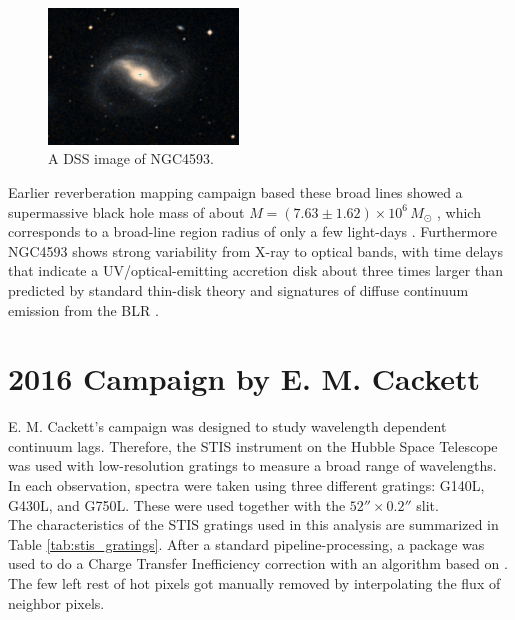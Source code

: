 \newpage

\begin{figure}[!ht]
	\centering
	\includegraphics[width=0.45\textwidth]{pictures/Chapter3/NGC4593.PNG}
	\caption{A DSS image of NGC4593.}
	\label{fig:NGC4593}
\end{figure}


 Earlier reverberation mapping campaign based these broad lines showed a supermassive black hole mass of about $M = \left(7.63 \pm 1.62\right) \times 10^6\,M_\odot$ \parencite{bentz2015agn}, which corresponds to a broad-line region radius of only a few light-days \parencite{denney2006ngc4593}. Furthermore NGC4593 shows strong variability from X-ray to optical bands, with time delays that indicate a UV/optical-emitting accretion disk about three times larger than predicted by standard thin-disk theory and signatures of diffuse continuum emission from the BLR \parencite{cackett2018accretion}. 


\section{2016 Campaign by E. M. Cackett}
\label{Campaign_Cackett}

E. M. Cackett's campaign was designed to study wavelength dependent continuum lags. Therefore, the STIS instrument on the Hubble Space Telescope was used with low-resolution gratings to measure a broad range of wavelengths. In each observation, spectra were taken using three different gratings: G140L, G430L, and G750L. These were used together with the $52'' \times 0.2''$ slit.\\
The characteristics of the STIS gratings used in this analysis are summarized in Table \ref{tab:stis_gratings}. After a standard pipeline-processing, a package was used to do a Charge Transfer Inefficiency correction with an algorithm based on \parencite{anderson2010empirical}. The few left rest of hot pixels got manually removed by interpolating the flux of neighbor pixels.\\


